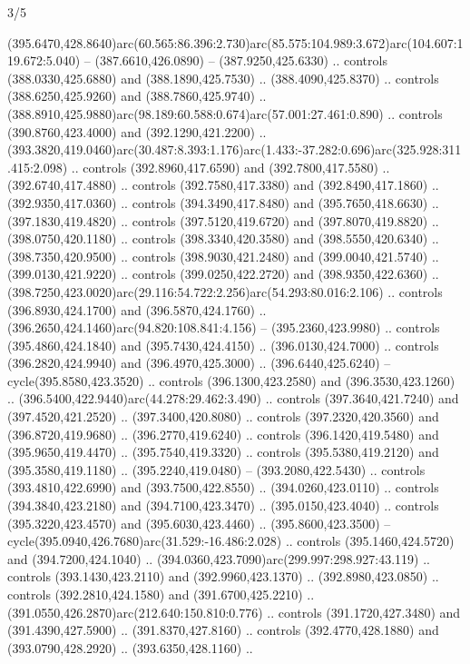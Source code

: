 \begin{flagdescription}{3/5}
\begin{scope}[shift={(0.5\flaglength,0.5\flagwidth)},scale=\flagwidth/510]
\begin{scope}[y=0.80pt, x=0.80pt, yscale=-1.06, xscale=1.06,yshift=-240pt,xshift=-400pt]
\begin{scope}[cm={{0.83333,0.0,0.0,0.83333,(154.64672,48.64761)}}]
\begin{scope}[cm={{0.93334,0.0,0.0,0.93334,(-4.86471,22.64035)}}]
\begin{scope}[draw=black]
  (395.6470,428.8640)arc(60.565:86.396:2.730)arc(85.575:104.989:3.672)arc(104.607:119.672:5.040)
  -- (387.6610,426.0890) -- (387.9250,425.6330) .. controls (388.0330,425.6880)
  and (388.1890,425.7530) .. (388.4090,425.8370) .. controls (388.6250,425.9260)
  and (388.7860,425.9740) ..
  (388.8910,425.9880)arc(98.189:60.588:0.674)arc(57.001:27.461:0.890) ..
  controls (390.8760,423.4000) and (392.1290,421.2200) ..
  (393.3820,419.0460)arc(30.487:8.393:1.176)arc(1.433:-37.282:0.696)arc(325.928:311.415:2.098)
  .. controls (392.8960,417.6590) and (392.7800,417.5580) .. (392.6740,417.4880)
  .. controls (392.7580,417.3380) and (392.8490,417.1860) .. (392.9350,417.0360)
  .. controls (394.3490,417.8480) and (395.7650,418.6630) .. (397.1830,419.4820)
  .. controls (397.5120,419.6720) and (397.8070,419.8820) .. (398.0750,420.1180)
  .. controls (398.3340,420.3580) and (398.5550,420.6340) .. (398.7350,420.9500)
  .. controls (398.9030,421.2480) and (399.0040,421.5740) .. (399.0130,421.9220)
  .. controls (399.0250,422.2720) and (398.9350,422.6360) ..
  (398.7250,423.0020)arc(29.116:54.722:2.256)arc(54.293:80.016:2.106) ..
  controls (396.8930,424.1700) and (396.5870,424.1760) ..
  (396.2650,424.1460)arc(94.820:108.841:4.156) -- (395.2360,423.9980) ..
  controls (395.4860,424.1840) and (395.7430,424.4150) .. (396.0130,424.7000) ..
  controls (396.2820,424.9940) and (396.4970,425.3000) .. (396.6440,425.6240) --
  cycle(395.8580,423.3520) .. controls (396.1300,423.2580) and
  (396.3530,423.1260) .. (396.5400,422.9440)arc(44.278:29.462:3.490) .. controls
  (397.3640,421.7240) and (397.4520,421.2520) .. (397.3400,420.8080) .. controls
  (397.2320,420.3560) and (396.8720,419.9680) .. (396.2770,419.6240) .. controls
  (396.1420,419.5480) and (395.9650,419.4470) .. (395.7540,419.3320) .. controls
  (395.5380,419.2120) and (395.3580,419.1180) .. (395.2240,419.0480) --
  (393.2080,422.5430) .. controls (393.4810,422.6990) and (393.7500,422.8550) ..
  (394.0260,423.0110) .. controls (394.3840,423.2180) and (394.7100,423.3470) ..
  (395.0150,423.4040) .. controls (395.3220,423.4570) and (395.6030,423.4460) ..
  (395.8600,423.3500) -- cycle(395.0940,426.7680)arc(31.529:-16.486:2.028) ..
  controls (395.1460,424.5720) and (394.7200,424.1040) ..
  (394.0360,423.7090)arc(299.997:298.927:43.119) .. controls (393.1430,423.2110)
  and (392.9960,423.1370) .. (392.8980,423.0850) .. controls (392.2810,424.1580)
  and (391.6700,425.2210) .. (391.0550,426.2870)arc(212.640:150.810:0.776) ..
  controls (391.1720,427.3480) and (391.4390,427.5900) .. (391.8370,427.8160) ..
  controls (392.4770,428.1880) and (393.0790,428.2920) .. (393.6350,428.1160) ..

\end{scope}
\end{scope}
\end{scope}
\end{scope}
\end{scope}
\end{flagdescription}
